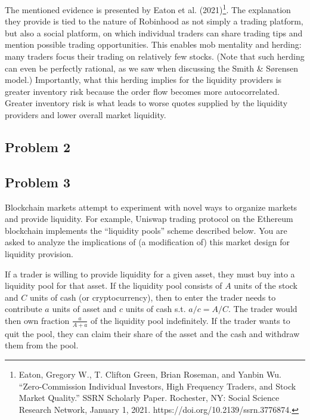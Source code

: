 \begin{solution}
	The mentioned evidence is presented by Eaton et al. (2021)\footnote{Eaton, Gregory W., T. Clifton Green, Brian Roseman, and Yanbin Wu. ``Zero-Commission Individual Investors, High Frequency Traders, and Stock Market Quality.'' SSRN Scholarly Paper. Rochester, NY: Social Science Research Network, January 1, 2021. https://doi.org/10.2139/ssrn.3776874.}.
	The explanation they provide is tied to the nature of Robinhood as not simply a trading platform, but also a social platform, on which individual traders can share trading tips and mention possible trading opportunities. This enables mob mentality and herding: many traders focus their trading on relatively few stocks. (Note that such herding can even be perfectly rational, as we saw when discussing the Smith \& S{\o}rensen model.) Importantly, what this herding implies for the liquidity providers is greater inventory risk because the order flow becomes more autocorrelated. Greater inventory risk is what leads to worse quotes supplied by the liquidity providers and lower overall market liquidity.
\end{solution}




\quad
\subsection*{Problem 2}




\begin{solution}
	
\end{solution}




\quad
\subsection*{Problem 3}
	Blockchain markets attempt to experiment with novel ways to organize markets and provide liquidity. For example, Uniswap trading protocol on the Ethereum blockchain implements the ``liquidity pools'' scheme described below. You are asked to analyze the implications of (a modification of) this market design for liquidity provision.
	
	If a trader is willing to provide liquidity for a given asset, they must buy into a liquidity pool for that asset. If the liquidity pool consists of $A$ units of the stock and $C$ units of cash (or cryptocurrency), then to enter the trader needs to contribute $a$ units of asset and $c$ units of cash s.t. $a/c = A/C$. The trader would then own fraction $\frac{a}{A+a}$ of the liquidity pool indefinitely. If the trader wants to quit the pool, they can claim their share of the asset and the cash and withdraw them from the pool.
	
